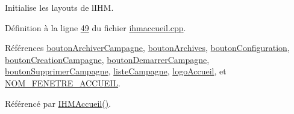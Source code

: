 Initialise les layouts de l\textquotesingle{}I\+HM. 



Définition à la ligne \hyperlink{ihmaccueil_8cpp_source_l00049}{49} du fichier \hyperlink{ihmaccueil_8cpp_source}{ihmaccueil.\+cpp}.



Références \hyperlink{ihmaccueil_8h_source_l00035}{bouton\+Archiver\+Campagne}, \hyperlink{ihmaccueil_8h_source_l00031}{bouton\+Archives}, \hyperlink{ihmaccueil_8h_source_l00032}{bouton\+Configuration}, \hyperlink{ihmaccueil_8h_source_l00033}{bouton\+Creation\+Campagne}, \hyperlink{ihmaccueil_8h_source_l00034}{bouton\+Demarrer\+Campagne}, \hyperlink{ihmaccueil_8h_source_l00036}{bouton\+Supprimer\+Campagne}, \hyperlink{ihmaccueil_8h_source_l00037}{liste\+Campagne}, \hyperlink{ihmaccueil_8h_source_l00038}{logo\+Accueil}, et \hyperlink{ihmaccueil_8h_source_l00014}{N\+O\+M\+\_\+\+F\+E\+N\+E\+T\+R\+E\+\_\+\+A\+C\+C\+U\+E\+IL}.



Référencé par \hyperlink{ihmaccueil_8cpp_source_l00014}{I\+H\+M\+Accueil()}.


